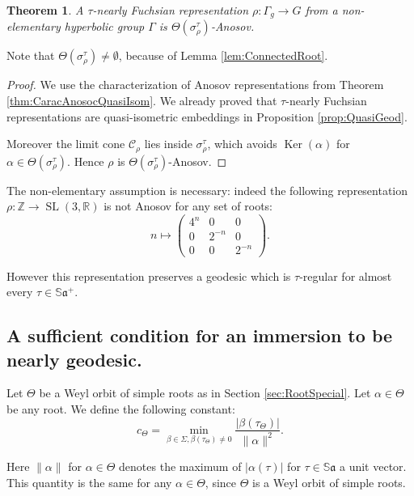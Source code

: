 \documentclass[reqno,10pt]{amsart}
\theoremstyle{plain}
\newtheorem{thm}{Theorem}[section]
\theoremstyle{definition}
\theoremstyle{remark}
\newcommand{\type}{\tau}
\newcommand{\R}{\mathbb{R}}
\newcommand{\Sph}{\mathbb{S}}
\DeclareMathOperator{\SL}{SL}
\DeclareMathOperator{\Ker}{Ker}
\begin{document}
\begin{thm}
\label{thm:NearlyfuchsianAnosov}
A $\type$-nearly Fuchsian representation $\rho:\Gamma_g\to G$ from a non-elementary hyperbolic group $\Gamma$ is $\Theta(\sigma_\rho^\type)$-Anosov.
\end{thm}

Note that $\Theta(\sigma_\rho^\type)\neq \emptyset$, because of Lemma \ref{lem:ConnectedRoot}.

\medskip

\begin{proof}
We use the characterization of Anosov representations from Theorem \ref{thm:CaracAnosocQuasiIsom}. We already proved that $\type$-nearly Fuchsian representations are quasi-isometric embeddings in Proposition \ref{prop:QuasiGeod}. 

\medskip

Moreover the limit cone $\mathcal{C}_\rho$ lies inside $\sigma^\type_\rho$, which avoids $\Ker(\alpha)$ for $\alpha\in\Theta(\sigma_\rho^\type)$. Hence $\rho$ is $\Theta(\sigma_\rho^\type)$-Anosov.
\end{proof}

The non-elementary assumption is necessary: indeed the following representation $\rho:\mathbb{Z}\to \SL(3,\R)$ is not Anosov for any set of roots:
$$n \mapsto \begin{pmatrix}
4^n &0 &0 \\
 0& 2^{-n}&0 \\
 0&0 &2^{-n}
\end{pmatrix}.$$

However this representation preserves a geodesic which is $\type$-regular for almost every $\type\in \Sph\mathfrak{a}^+$.

\subsection{A sufficient condition for an immersion to be nearly geodesic.}
\label{subsec:Finsler}
Let $\Theta$ be a Weyl orbit of simple roots as in Section \ref{sec:RootSpecial}. Let $\alpha\in \Theta$ be any root. We define the following constant:
\begin{equation}
\label{eq:constantTheta}
c_\Theta= \min_{\beta\in \Sigma, \beta(\type_\Theta)\neq 0}\frac{|\beta(\type_\Theta)|}{\lVert\alpha\rVert^2}.
\end{equation}

Here $\lVert\alpha\rVert$ for $\alpha \in \Theta$ denotes the maximum of $|\alpha(\type)|$ for $\type\in \Sph\mathfrak{a}$ a unit vector. This quantity is the same for any $\alpha\in \Theta$, since $\Theta$ is a Weyl orbit of simple roots.
\end{document}
